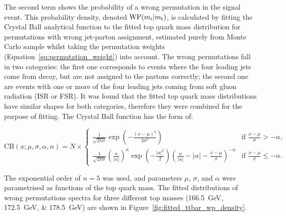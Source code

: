 The second term shows the probability of a wrong permutation in the signal event. This probability density, denoted
$\textrm{WP}(m_i|m_\mathrm{t})$, is calculated by fitting the Crystal Ball analytical function to the fitted top quark mass
distribution for permutations with wrong jet-parton assignment, estimated purely from Monte Carlo \ttbar sample whilst
taking the permutation weights (Equation~\ref{eq:permutation_weight}) into account. The wrong permutations fall in two
categories: the first one corresponds to events where the four leading jets come from \ttbar decay, but are not assigned
to the partons correctly; the second one are events with one or more of the four leading jets coming from soft gluon
radiation (ISR or FSR). It was found that the fitted top quark mass distributions have similar shapes for both
categories, therefore they were combined for the purpose of fitting. The Crystal Ball function \autocite{CB1, CB2} has
the form of:

\begin{equation}
\textrm{CB}(x;\mu,\sigma,\alpha,n) = N \times
\begin{cases}
\frac{1}{\sqrt{2\pi\sigma}}\exp(-\frac{(x-\mu)^2}{2\sigma^2}) & \text{if $\frac{x-\mu}{\sigma} > -\alpha$,} \\
\frac{1}{\sqrt{2\pi\sigma}}(\frac{n}{|\alpha|})^n
\exp(-\frac{|\alpha|^2}{2})(\frac{n}{|\alpha|}-|\alpha|-\frac{x-\mu}{\sigma})^{-n} & \text{if $\frac{x-\mu}{\sigma}
\leq -\alpha$.}
\end{cases}
\label{eq:crystal_ball}
\end{equation}

The exponential order of $n=\num{5}$ was used, and parameters $\mu$, $\sigma$, and $\alpha$ were parametrised as
functions of the top quark mass. The fitted distributions of wrong permutations spectra for three different top masses
(\SIlist{166.5;172.5;178.5}{\GeV}) are shown in Figure~\ref{fig:fitted_ttbar_wp_density}.

